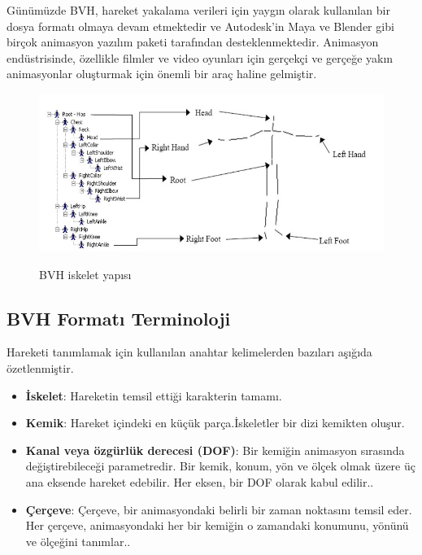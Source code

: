 \documentclass[12pt, a4paper]{article}
\begin{document}
Günümüzde BVH, hareket yakalama verileri için yaygın olarak kullanılan bir dosya formatı olmaya devam etmektedir ve Autodesk'in Maya ve Blender gibi birçok animasyon yazılım paketi tarafından desteklenmektedir. Animasyon endüstrisinde, özellikle filmler ve video oyunları için gerçekçi ve gerçeğe yakın animasyonlar oluşturmak için önemli bir araç haline gelmiştir.\cite{biovision-file-format-1}
\begin{figure}[h]
	\centering
	\includegraphics[width=8.5 cm , height = 5 cm ]{bvhyeni.png}
	\caption{BVH iskelet yapısı} \cite{biovision-file-format-2}
\end{figure}
\subsection{BVH Formatı Terminoloji}
Hareketi tanımlamak için kullanılan anahtar kelimelerden bazıları aşığıda özetlenmiştir.
\begin{itemize}
	\item{\textbf {İskelet}}: Hareketin temsil ettiği karakterin tamamı.
	\item {\textbf {Kemik}}: Hareket içindeki en küçük parça.İskeletler bir dizi kemikten oluşur.
	\item {\textbf {Kanal veya özgürlük derecesi (DOF)}}: Bir kemiğin animasyon sırasında değiştirebileceği parametredir. Bir kemik, konum, yön ve ölçek olmak üzere üç ana eksende hareket edebilir. Her eksen, bir DOF olarak kabul edilir..
	\item {\textbf {Çerçeve}}: Çerçeve, bir animasyondaki belirli bir zaman noktasını temsil eder. Her çerçeve, animasyondaki her bir kemiğin o zamandaki konumunu, yönünü ve ölçeğini tanımlar..
	
\end{itemize}
\end{document}
